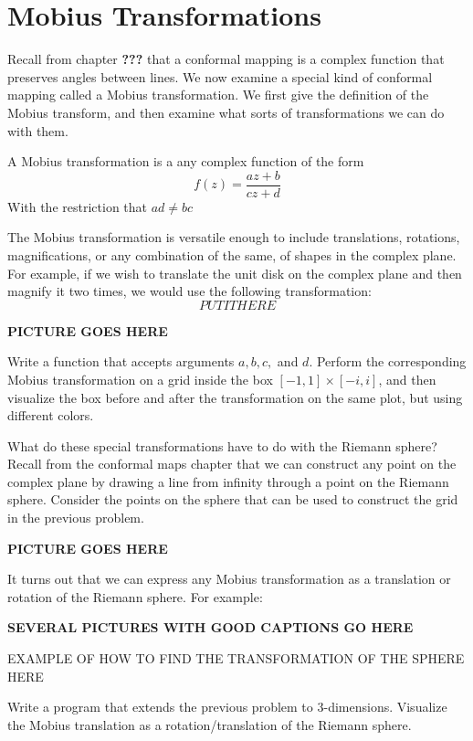 \section*{Mobius Transformations}

Recall from chapter {\bf ???} that a conformal mapping is a complex function that preserves angles between lines.  We now examine a special kind of conformal mapping called a Mobius transformation.  We first give the definition of the Mobius transform, and then examine what sorts of transformations we can do with them.

\begin{definition}  A Mobius transformation is a any complex function of the form
\[
f(z) = \frac{az + b}{cz + d}
\]
With the restriction that $ad \neq bc$
\end{definition}

The Mobius transformation is versatile enough to include translations, rotations, magnifications, or any combination of the same, of shapes in the complex plane.  For example, if we wish to translate the unit disk on the complex plane and then magnify it two times, we would use the following transformation:
\[
PUT IT HERE
\]

{\bf PICTURE GOES HERE}

\begin{problem} Write a \ProgrammingLanguage function that accepts arguments $a,b,c,$ and $d$.  Perform the corresponding Mobius transformation on a grid inside the box $[-1,1]\times[-i,i]$, and then visualize the box before and after the transformation on the same plot, but using different colors.
\end{problem}

What do these special transformations have to do with the Riemann sphere?  Recall from the conformal maps chapter that we can construct any point on the complex plane by drawing a line from infinity through a point on the Riemann sphere.  Consider the points on the sphere that can be used to construct the grid in the previous problem.

{\bf PICTURE GOES HERE}

It turns out that we can express any Mobius transformation as a translation or rotation of the Riemann sphere.  For example:

{\bf SEVERAL PICTURES WITH GOOD CAPTIONS GO HERE}

EXAMPLE OF HOW TO FIND THE TRANSFORMATION OF THE SPHERE HERE

\begin{problem}  Write a \ProgrammingLanguage program that extends the previous problem to 3-dimensions.  Visualize the Mobius translation as a rotation/translation of the Riemann sphere.
\end{problem}



